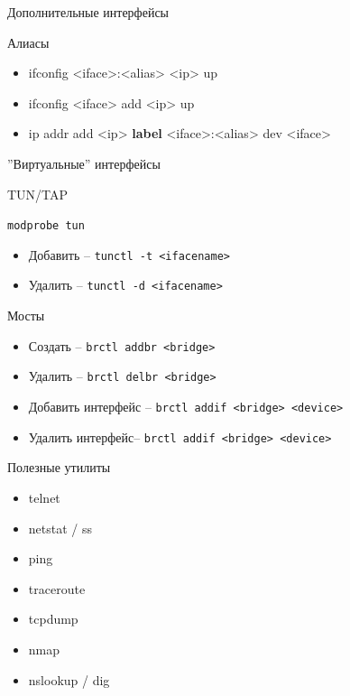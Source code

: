 \documentclass[ignorenonframetext, professionalfonts, hyperref={pdftex, unicode}]{beamer}
\begin{document}
\begin{frame}{Дополнительные интерфейсы}
	\begin{block}{Алиасы}
		\begin{itemize}
			\item ifconfig <iface>:<alias> <ip> up
			\item ifconfig <iface> add <ip> up
			\item ip addr add <ip> {\bf label} <iface>:<alias> dev <iface>
		\end{itemize}
	\end{block}
\end{frame}

\begin{frame}{''Виртуальные'' интерфейсы}
	\begin{block}{TUN/TAP}

		{\tt modprobe tun}

		\begin{itemize}
			\item Добавить -- {\tt tunctl -t <ifacename>}
			\item Удалить -- {\tt tunctl -d <ifacename>}
		\end{itemize}
	\end{block}
\end{frame}

\begin{frame}{Мосты}
	\begin{itemize}
		\item Создать -- {\tt brctl addbr <bridge>}
		\item Удалить -- {\tt brctl delbr <bridge>}
		\item Добавить интерфейс -- {\tt brctl addif <bridge> <device>}
		\item Удалить интерфейс-- {\tt brctl addif <bridge> <device>}
	\end{itemize}
\end{frame}

\begin{frame}{Полезные утилиты}

	\begin{itemize}
		\item telnet
		\item netstat / ss
		\item ping
		\item traceroute
		\item tcpdump
		\item nmap
		\item nslookup / dig
	\end{itemize}

\end{frame}
\end{document}
